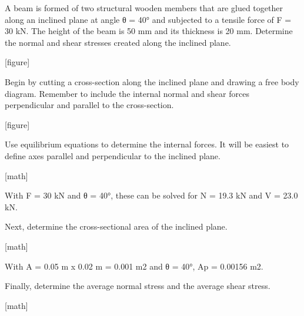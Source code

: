 \documentclass[
  letterpaper,
  DIV=11,
  numbers=noendperiod]{scrreprt}
\begin{document}
\begin{tcolorbox}[enhanced jigsaw, colback=white, colframe=quarto-callout-note-color-frame, leftrule=.75mm, opacitybacktitle=0.6, colbacktitle=quarto-callout-note-color!10!white, arc=.35mm, bottomrule=.15mm, breakable, title={Example 2.5: Inclined plane}, left=2mm, titlerule=0mm, toptitle=1mm, toprule=.15mm, opacityback=0, rightrule=.15mm, coltitle=black, bottomtitle=1mm]

A beam is formed of two structural wooden members that are glued
together along an inclined plane at angle θ = 40° and subjected to a
tensile force of F = 30 kN. The height of the beam is 50 mm and its
thickness is 20 mm. Determine the normal and shear stresses created
along the inclined plane.

{[}figure{]}

\begin{tcolorbox}[enhanced jigsaw, colback=white, colframe=quarto-callout-note-color-frame, leftrule=.75mm, opacitybacktitle=0.6, colbacktitle=quarto-callout-note-color!10!white, arc=.35mm, bottomrule=.15mm, breakable, title={Solution}, left=2mm, titlerule=0mm, toptitle=1mm, toprule=.15mm, opacityback=0, rightrule=.15mm, coltitle=black, bottomtitle=1mm]

Begin by cutting a cross-section along the inclined plane and drawing a
free body diagram. Remember to include the internal normal and shear
forces perpendicular and parallel to the cross-section.

{[}figure{]}

Use equilibrium equations to determine the internal forces. It will be
easiest to define axes parallel and perpendicular to the inclined plane.

{[}math{]}

With F = 30 kN and θ = 40°, these can be solved for N = 19.3 kN and V =
23.0 kN.

Next, determine the cross-sectional area of the inclined plane.

{[}math{]}

With A = 0.05 m x 0.02 m = 0.001 m2 and θ = 40°, Ap = 0.00156 m2.

Finally, determine the average normal stress and the average shear
stress.

{[}math{]}

\end{tcolorbox}

\end{tcolorbox}
\end{document}
